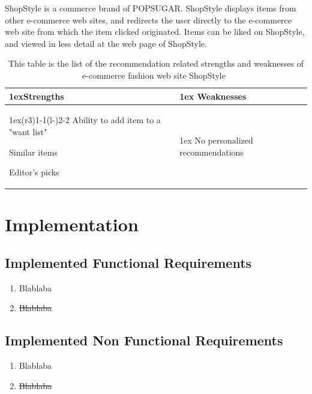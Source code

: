     ShopStyle is a commerce brand of POPSUGAR.
    ShopStyle displays items from other e-commerce web sites, and redirects the user directly to the e-commerce web site from which the item clicked originated.
    Items can be liked on ShopStyle, and viewed in less detail at the web page of ShopStyle.
    \begin{table}[H]
                    \centering
                    \begin{tabularx}{\linewidth}{>{\parskip1ex}X@{\kern4\tabcolsep}>{\parskip1ex}X}
                    \toprule
                    \hfil\bfseries Strengths
                    &
                    \hfil\bfseries Weaknesses
                    \\\cmidrule(r{3\tabcolsep}){1-1}\cmidrule(l{-\tabcolsep}){2-2}
                Ability to add item to a "want list" \par
                Similar items \par
                Editor's picks \par
            &
                No personalized recommendations \par
            \\ \bottomrule
        \end{tabularx}
        \caption[Recommendation related strengths and weaknesses of ShopStyle~\cite{ShopStyle}]{This table is the list of the recommendation related strengths and weaknesses of e-commerce fashion web site ShopStyle~\cite{ShopStyle}}
        \label{table:ecommenreceShopStyle}
    \end{table}


\chapter{Implementation}\label{app:impl}
\section{Implemented Functional Requirements}
\begin{enumerate}[label=\bfseries FR \arabic*:]
  \item {\color{ForestGreen}Blablaba}
  \item {\color{RedOrange}\st{Blablaba}}
\end{enumerate}

\section{Implemented Non Functional Requirements}
\begin{enumerate}[label=\bfseries NFR \arabic*:]
  \item {\color{ForestGreen}Blablaba}
  \item {\color{RedOrange}\st{Blablaba}}
\end{enumerate}

